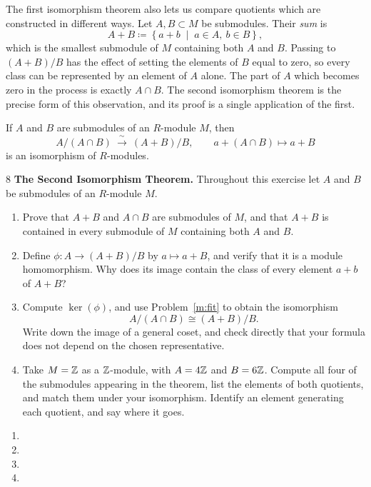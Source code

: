 \documentclass[Notebook.tex]{subfiles}
\begin{document}
\newpage

The first isomorphism theorem also lets us compare quotients which are constructed in different ways. Let $A,B\subset M$ be submodules. Their \emph{sum} is
\[
A+B\coloneqq\left\{a+b \;\; \big| \;\; a\in A,\ b\in B\right\},
\]
which is the smallest submodule of $M$ containing both $A$ and $B$. Passing to $(A+B)/B$ has the effect of setting the elements of $B$ equal to zero, so every class can be represented by an element of $A$ alone. The part of $A$ which becomes zero in the process is exactly $A\cap B$. The second isomorphism theorem is the precise form of this observation, and its proof is a single application of the first.

\begin{theorem}
	If $A$ and $B$ are submodules of an $R$-module $M$, then
	\[
	A/(A\cap B)\ \xrightarrow{\ \sim\ }\ (A+B)/B,
	\qquad a+(A\cap B)\longmapsto a+B
	\]
	is an isomorphism of $R$-modules.
\end{theorem}

\hrulefill

\begin{problem}{8}\label{m:second}
	\textbf{The Second Isomorphism Theorem.} Throughout this exercise let $A$ and $B$ be submodules of an $R$-module $M$.
	\begin{enumerate}[label=(\alph*),ref=\theenumi\alph*]
		\item Prove that $A+B$ and $A\cap B$ are submodules of $M$, and that $A+B$ is contained in every submodule of $M$ containing both $A$ and $B$.
		\item Define $\phi:A\to(A+B)/B$ by $a\mapsto a+B$, and verify that it is a module homomorphism. Why does its image contain the class of every element $a+b$ of $A+B$?
		\item Compute $\ker(\phi)$, and use Problem~\ref{m:fit} to obtain the isomorphism
		\[
		A/(A\cap B)\cong(A+B)/B.
		\]
		Write down the image of a general coset, and check directly that your formula does not depend on the chosen representative.
		\item Take $M=\mathbb Z$ as a $\mathbb Z$-module, with $A=4\mathbb Z$ and $B=6\mathbb Z$. Compute all four of the submodules appearing in the theorem, list the elements of both quotients, and match them under your isomorphism. Identify an element generating each quotient, and say where it goes.
	\end{enumerate}
\end{problem}

\begin{solution}
	\bbni
	\begin{enumerate}[label=(\alph*),ref=\theenumi\alph*]
		\item
		\item
		\item
		\item
	\end{enumerate}
\end{solution}
\end{document}

